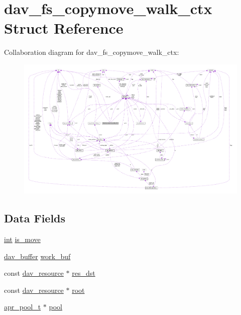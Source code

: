 \hypertarget{structdav__fs__copymove__walk__ctx}{}\section{dav\+\_\+fs\+\_\+copymove\+\_\+walk\+\_\+ctx Struct Reference}
\label{structdav__fs__copymove__walk__ctx}


Collaboration diagram for dav\+\_\+fs\+\_\+copymove\+\_\+walk\+\_\+ctx\+:
\nopagebreak
\begin{figure}[H]
\begin{center}
\leavevmode
\includegraphics[width=350pt]{structdav__fs__copymove__walk__ctx__coll__graph}
\end{center}
\end{figure}
\subsection*{Data Fields}
\begin{DoxyCompactItemize}
\item 
\hyperlink{pcre_8txt_a42dfa4ff673c82d8efe7144098fbc198}{int} \hyperlink{structdav__fs__copymove__walk__ctx_aa7497ba6146ba7339acfe092a02b2091}{is\+\_\+move}
\item 
\hyperlink{structdav__buffer}{dav\+\_\+buffer} \hyperlink{structdav__fs__copymove__walk__ctx_a4d23d1bad977b122ab0e40ce6f3fe727}{work\+\_\+buf}
\item 
const \hyperlink{structdav__resource}{dav\+\_\+resource} $\ast$ \hyperlink{structdav__fs__copymove__walk__ctx_aa368171e4dc387dac3e573394a0ddffa}{res\+\_\+dst}
\item 
const \hyperlink{structdav__resource}{dav\+\_\+resource} $\ast$ \hyperlink{structdav__fs__copymove__walk__ctx_a0442f9d03a1cf4ba98ff93d37a3af024}{root}
\item 
\hyperlink{structapr__pool__t}{apr\+\_\+pool\+\_\+t} $\ast$ \hyperlink{structdav__fs__copymove__walk__ctx_a691cec5ab091272a9ea6214fd49f7e7f}{pool}
\end{DoxyCompactItemize}


